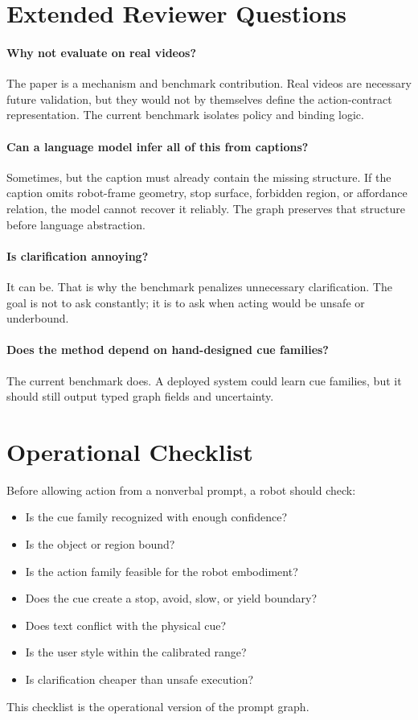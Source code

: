 \documentclass{article}
\begin{document}
\section{Extended Reviewer Questions}

\paragraph{Why not evaluate on real videos?}
The paper is a mechanism and benchmark contribution. Real videos are necessary future validation, but they would not by themselves define the action-contract representation. The current benchmark isolates policy and binding logic.

\paragraph{Can a language model infer all of this from captions?}
Sometimes, but the caption must already contain the missing structure. If the caption omits robot-frame geometry, stop surface, forbidden region, or affordance relation, the model cannot recover it reliably. The graph preserves that structure before language abstraction.

\paragraph{Is clarification annoying?}
It can be. That is why the benchmark penalizes unnecessary clarification. The goal is not to ask constantly; it is to ask when acting would be unsafe or underbound.

\paragraph{Does the method depend on hand-designed cue families?}
The current benchmark does. A deployed system could learn cue families, but it should still output typed graph fields and uncertainty.

\section{Operational Checklist}

Before allowing action from a nonverbal prompt, a robot should check:
\begin{itemize}
\item Is the cue family recognized with enough confidence?
\item Is the object or region bound?
\item Is the action family feasible for the robot embodiment?
\item Does the cue create a stop, avoid, slow, or yield boundary?
\item Does text conflict with the physical cue?
\item Is the user style within the calibrated range?
\item Is clarification cheaper than unsafe execution?
\end{itemize}
This checklist is the operational version of the prompt graph.
\end{document}
